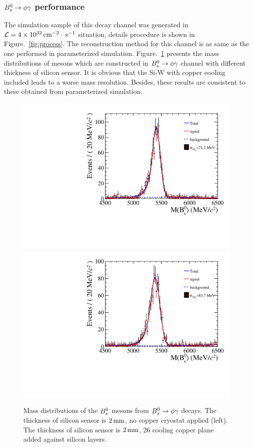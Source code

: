 \subsubsection{${{B}^0_{s}}\rightarrow\phi\gamma$ performance}
The simulation sample of this decay channel was generated in $\mathcal{L}=4\times10^{32}\text{\,cm}^{-2}\cdot\text{\,s}^{-1}$ situation,
details procedure is shown in Figure.~\ref{fig:process}.
The reconstruction method for this channel is as same as the one performed in parameterized simulation.  
Figure.~\ref{fig:Bs_mass_B2PhiGamma} presents the mass distributions of \Bs mesons which are constructed in ${{B}^0_{s}}\rightarrow\phi\gamma$ channel with different thickness of silicon sensor.
It is obvious that the Si-W with copper cooling included leads to a worse \Bs mass resolution.
Besides,
these results are consistent to these obtained from parameterized simulation. 
\begin{figure}[!htbp]
  \begin{center}
    \includegraphics[width=0.49\linewidth]{Figures/06_ECAL/Bs_PhiGamma/diff_thickness/low_lumi/plots/Bs_0_2.pdf}
    \includegraphics[width=0.49\linewidth]{Figures/06_ECAL/Bs_PhiGamma/diff_thickness/low_lumi/plots/Bs_Cu_0_2.pdf}
    \vspace*{-0.5cm}
  \end{center}
  \caption{
   Mass distributions of the ${{B}^0_{s}}$ mesons from ${{B}^0_{s}}\rightarrow\phi\gamma$ decays. 
   The thickness of silicon sensor is $2\text{\,mm}$, no copper cryostat applied (left). 
   The thickness of silicon sensor is $2\text{\,mm}$, 26 cooling copper plane added against silicon layers.
  }
  \label{fig:Bs_mass_B2PhiGamma}
\end{figure}

